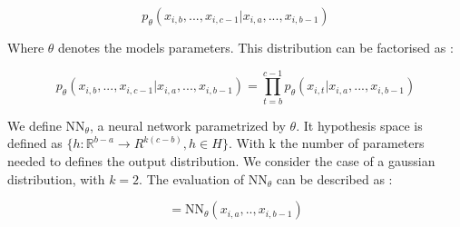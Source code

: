 \begin{equation} \label{distrib_proba_equ}
    p_{\theta}(x_{i,b}, ..., x_{i,c-1} | x_{i,a}, ..., x_{i,b-1}) 
\end{equation}

Where $\theta$ denotes the models parameters.
This distribution can be factorised as :

\begin{equation} \label{distrib_proba_fact_equ}
    p_{\theta}(x_{i,b}, ..., x_{i,c-1} | x_{i,a}, ..., x_{i,b-1}) =
    \prod_{t=b}^{c-1}p_{\theta}(x_{i,t} | x_{i,a}, ..., x_{i,b-1})
\end{equation}


We define $\text{NN}_\theta$, a neural network parametrized by $\theta$. It hypothesis space is defined as $\{ h : \mathbb{R}^{b-a} \to R ^{k(c-b)}, h \in H \}$. With k the number of parameters needed to defines the output distribution. 
We consider the case of a gaussian distribution, with $k=2$. The evaluation of $\text{NN}_\theta$ can be described as :


\begin{equation}
    [\mu_{\theta i,b},..,\mu_{\theta i,c-1},\sigma_{\theta i,b},..,\sigma_{\theta i,c-1}] = \text{NN}_\theta({x_{i,a}},..,{x_{i,b-1}})
\end{equation}









